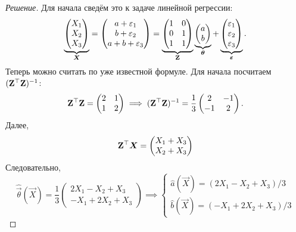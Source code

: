 \begin{proof}[Решение]
	Для начала сведём это к задаче линейной регрессии:
	\[
		\underbrace{\begin{pmatrix}
			X_{1} \\ X_{2} \\ X_{3}
		\end{pmatrix}}_{\bm{X}}
		= \begin{pmatrix}
			a + \varepsilon_{1} \\
			b + \varepsilon_{2} \\
			a + b + \varepsilon_{3}
		\end{pmatrix}
		= \underbrace{\begin{pmatrix}
			1 & 0 \\
			0 & 1 \\
			1 & 1
		\end{pmatrix}}_{\mathbf{Z}}
		\underbrace{\begin{pmatrix}
			a \\ b
		\end{pmatrix}}_{\bm{\theta}}
		+
		\underbrace{\begin{pmatrix}
			\varepsilon_{1} \\ \varepsilon_{2} \\ \varepsilon_{3}
		\end{pmatrix}}_{\bm{\varepsilon}}.
	\]
	Теперь можно считать по уже известной формуле. Для начала посчитаем $(\mathbf{Z}^{\top}\mathbf{Z})^{-1}$:
	\[
		\mathbf{Z}^{\top}\mathbf{Z}
		= \begin{pmatrix}
			2 & 1 \\
			1 & 2
		\end{pmatrix}
		\implies 
		(\mathbf{Z}^{\top}\mathbf{Z})^{-1}
		= \frac{1}{3}\begin{pmatrix}
			2 & -1 \\
			-1 & 2
		\end{pmatrix}.
	\]
	Далее,
	\[
		\mathbf{Z}^{\top}\bm{X} = \begin{pmatrix}
			X_{1} + X_{3} \\ X_{2} + X_{3}
		\end{pmatrix}
	\]
	Следовательно,
	\[
		\hat{\vec{\theta}}(\vec{X})
		= \frac{1}{3}\begin{pmatrix}
			2X_{1} - X_{2} + X_{3} \\
			-X_{1} + 2X_{2} + X_{3}
		\end{pmatrix}
		\implies
		\begin{cases}
			\hat{a}(\vec{X}) = (2X_{1} - X_{2} + X_{3})/3 \\
			\hat{b}(\vec{X}) = (-X_{1} + 2X_{2} + X_{3})/3 
		\end{cases}
	\]
\end{proof}

